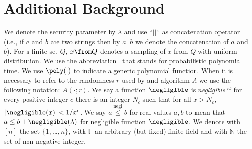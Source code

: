\section{Additional Background} \label{preliminaries}
We denote the security parameter by $\lambda$ and use ``$||$'' as concatenation operator 
(i.e., if $a$ and $b$ are two strings then by $a||b$ we denote the concatenation of $a$ and $b$). 
For a finite set $Q$, $x\from Q$ denotes a sampling of $x$ from $Q$ 
with uniform distribution. 
We use the abbreviation \ppt\ that stands for probabilistic polynomial time. We use $\poly(\cdot)$
 to indicate a generic polynomial function. 
When it is necessary to refer to the randomness $r$ used by and algorithm $A$ we use the following notation: $A(\cdot;r)$.
We say a function $\negligible$ is {\em negligible} if for every positive integer $c$ there is an integer $N_c$ such that for all $x > N_c$, $|\negligible(x)|< 1/x^c$.
We say $a \stackrel{\text{negl}}{\leq} b$ for real values $a, b$ to mean that $a \leq b + \negligible(\lambda)$ for negligible function $\negligible$.
We denote with $[n]$ the set  $\{1,\dots,n\}$, with $\mathbb{F}$ an arbitrary (but fixed) finite field and with $\mathbb{N}$ the set of non-negative integer.







